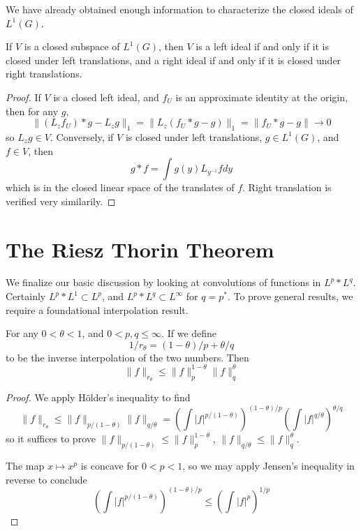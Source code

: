 We have already obtained enough information to characterize the closed ideals of $L^1(G)$.

\begin{theorem}
    If $V$ is a closed subspace of $L^1(G)$, then $V$ is a left ideal if and only if it is closed under left translations, and a right ideal if and only if it is closed under right translations.
\end{theorem}
\begin{proof}
    If $V$ is a closed left ideal, and $f_U$ is an approximate identity at the origin, then for any $g$,
    \[ \| (L_z f_U) * g - L_z g \|_1 = \| L_z (f_U * g - g) \|_1 = \| f_U * g - g \| \to 0 \]
    so $L_z g \in V$. Conversely, if $V$ is closed under left translations, $g \in L^1(G)$, and $f \in V$, then
    \[ g * f = \int g(y) L_{y^{-1}} f dy \]
    which is in the closed linear space of the translates of $f$. Right translation is verified very similarily.
\end{proof}

\section{The Riesz Thorin Theorem}

We finalize our basic discussion by looking at convolutions of functions in $L^p * L^q$. Certainly $L^p * L^1 \subset L^p$, and $L^p * L^q \subset L^\infty$ for $q = p^*$. To prove general results, we require a foundational interpolation result.
%
\begin{theorem}
    For any $0 < \theta < 1$, and $0 < p,q \leq \infty$. If we define
    \[ 1/r_\theta = (1-\theta)/p + \theta/q \]
    to be the inverse interpolation of the two numbers. Then
    \[ \| f \|_{r_\theta} \leq \| f \|_p^{1-\theta} \| f \|_q^\theta \]
\end{theorem}
\begin{proof}
    We apply H\"{o}lder's inequality to find
    \[ \| f \|_{r_\theta} \leq \| f \|_{p/(1 - \theta)} \| f \|_{q/\theta} = \left( \int |f|^{p/(1 - \theta)} \right)^{(1-  \theta)/p} \left( \int |f|^{q/\theta} \right)^{\theta/q} \]
    so it suffices to prove $\| f \|_{p/(1-\theta)} \leq \| f \|_p^{1-\theta}$, $\| f \|_{q/\theta} \leq \| f \|_q^\theta$.

    The map $x \mapsto x^p$ is concave for $0 < p < 1$, so we may apply Jensen's inequality in reverse to conclude
    \[ \left( \int |f|^{p/(1 - \theta)} \right)^{(1-  \theta)/p} \leq \left( \int |f|^p \right)^{1/p} \]
\end{proof}


